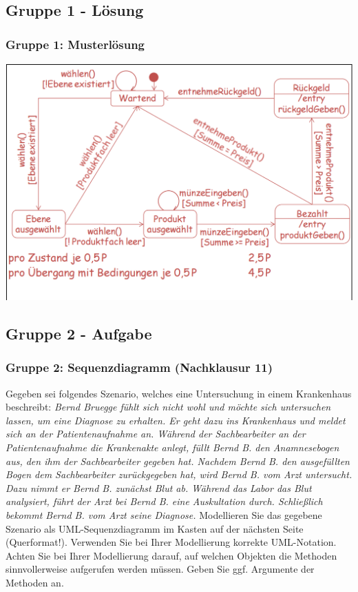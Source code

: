 \documentclass[18pt]{beamer}
\begin{document}
	\subsection{Gruppe 1 - Lösung}
	\begin{frame}
		\frametitle{Gruppe 1: Musterlösung}
		\includegraphics[scale=0.4]{./pics/tut2/group1sol.png}
	\end{frame}

	\subsection{Gruppe 2 - Aufgabe}
	\begin{frame}
		\frametitle{Gruppe 2: Sequenzdiagramm (Nachklausur 11)}
		\begin{tiny}
			Gegeben sei folgendes Szenario, welches eine Untersuchung in einem Krankenhaus beschreibt:  \linebreak
			\textit{Bernd Bruegge fühlt sich nicht wohl und möchte sich untersuchen lassen, um eine Diagnose
				zu erhalten. Er geht dazu ins Krankenhaus und meldet sich an der Patientenaufnahme
				an. Während der Sachbearbeiter an der Patientenaufnahme die Krankenakte anlegt,
				füllt Bernd B. den Anamnesebogen aus, den ihm der Sachbearbeiter gegeben hat.
				Nachdem Bernd B. den ausgefüllten Bogen dem Sachbearbeiter zurückgegeben hat, wird
				Bernd B. vom Arzt untersucht. Dazu nimmt er Bernd B. zunächst Blut ab. Während das
				Labor das Blut analysiert, führt der Arzt bei Bernd B. eine Auskultation durch. Schließlich
				bekommt Bernd B. vom Arzt seine Diagnose.} \linebreak
			Modellieren Sie das gegebene Szenario als UML-Sequenzdiagramm im Kasten auf der nächsten
			Seite (Querformat!). Verwenden Sie bei Ihrer Modellierung korrekte UML-Notation. Achten Sie
			bei Ihrer Modellierung darauf, auf welchen Objekten die Methoden sinnvollerweise aufgerufen
			werden müssen. Geben Sie ggf. Argumente der Methoden an. 
		\end{tiny}
	\end{frame}
\end{document}
